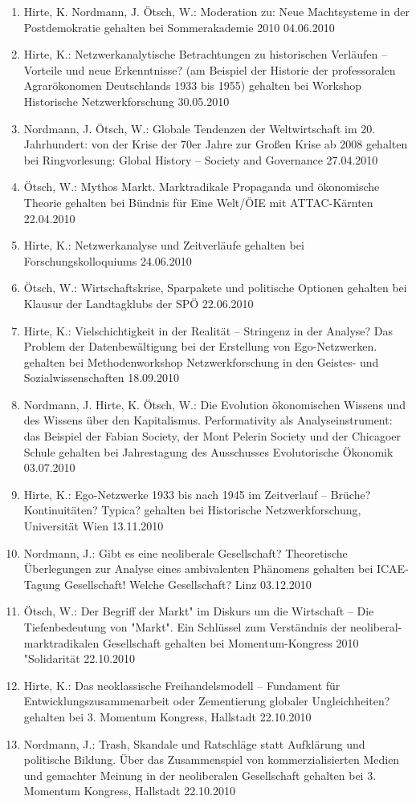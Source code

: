 \begin{enumerate}
	\item Hirte, K. Nordmann, J. Ötsch, W.: Moderation zu: Neue Machtsysteme in der Postdemokratie gehalten bei Sommerakademie 2010 04.06.2010
	\item Hirte, K.: Netzwerkanalytische Betrachtungen zu historischen Verläufen -- Vorteile und neue Erkenntnisse? (am Beispiel der Historie der professoralen Agrarökonomen Deutschlands 1933 bis 1955) gehalten bei Workshop Historische Netzwerkforschung 30.05.2010
	\item Nordmann, J. Ötsch, W.: Globale Tendenzen der Weltwirtschaft im 20. Jahrhundert: von der Krise der 70er Jahre zur Großen Krise ab 2008 gehalten bei Ringvorlesung: Global History -- Society and Governance 27.04.2010
	\item Ötsch, W.: Mythos Markt. Marktradikale Propaganda und ökonomische Theorie gehalten bei Bündnis für Eine Welt/ÖIE mit ATTAC-Kärnten 22.04.2010
	\item Hirte, K.: Netzwerkanalyse und Zeitverläufe gehalten bei Forschungskolloquiums 24.06.2010
	\item Ötsch, W.: Wirtschaftskrise, Sparpakete und politische Optionen gehalten bei Klausur der Landtagklubs der SPÖ 22.06.2010
	\item Hirte, K.: Vielschichtigkeit in der Realität -- Stringenz in der Analyse? Das Problem der Datenbewältigung bei der Erstellung von Ego-Netzwerken. gehalten bei Methodenworkshop Netzwerkforschung in den Geistes- und Sozialwissenschaften 18.09.2010
	\item Nordmann, J. Hirte, K. Ötsch, W.: Die Evolution ökonomischen Wissens und des Wissens über den Kapitalismus. Performativity als Analyseinstrument: das Beispiel der Fabian Society, der Mont Pelerin Society und der Chicagoer Schule gehalten bei Jahrestagung des Ausschusses Evolutorische Ökonomik 03.07.2010
	\item Hirte, K.: Ego-Netzwerke 1933 bis nach 1945 im Zeitverlauf -- Brüche? Kontinuitäten? Typica? gehalten bei Historische Netzwerkforschung, Universität Wien 13.11.2010
	\item Nordmann, J.: Gibt es eine neoliberale Gesellschaft? Theoretische Überlegungen zur Analyse eines ambivalenten Phänomens gehalten bei ICAE-Tagung Gesellschaft! Welche Gesellschaft? Linz 03.12.2010
	\item Ötsch, W.: Der Begriff \glqq der Markt" im Diskurs um die Wirtschaft -- Die Tiefenbedeutung von "Markt". Ein Schlüssel zum Verständnis der neoliberal-marktradikalen Gesellschaft gehalten bei Momentum-Kongress 2010 "Solidarität\grqq{} 22.10.2010
	\item Hirte, K.: Das neoklassische Freihandelsmodell -- Fundament für Entwicklungszusammenarbeit oder Zementierung globaler Ungleichheiten? gehalten bei 3. Momentum Kongress, Hallstadt 22.10.2010
	\item Nordmann, J.: Trash, Skandale und Ratschläge statt Aufklärung und politische Bildung. Über das Zusammenspiel von kommerzialisierten Medien und gemachter Meinung in der neoliberalen Gesellschaft gehalten bei 3. Momentum Kongress, Hallstadt 22.10.2010
\end{enumerate}
